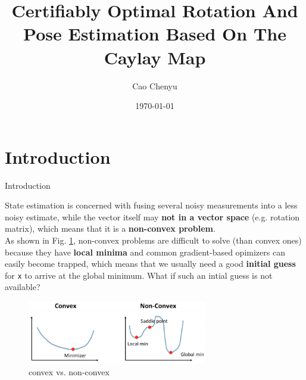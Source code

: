 \documentclass[8pt]{beamer}
\title[National University of Singapore]{\textbf{Certifiably Optimal Rotation And Pose Estimation Based On The Caylay Map}}
\author[cchenyu]{Cao Chenyu}
\institute[c.chenyu@u.nus.edu]{National University of Singapore}
\date[ME5419 Presentation]{\today}
\begin{document}
\frame{\titlepage}
\section{Introduction}
\begin{frame}{Introduction}

State estimation is concerned with fusing several noisy measurements into a less noisy estimate, while the vector itself may \textbf{not in a vector space} (e.g. rotation matrix), which means that it is a \textbf{non-convex problem}.\\
\vspace{1em}
As shown in Fig. \ref{fig:non-convex}, non-convex problems are difficult to solve (than convex ones) because they have \textbf{local minima} and common gradient-based opimizers can easily become trapped, which means that we usually need a good \textbf{initial guess} for \texttt{x} to arrive at the global minimum. What if such an intial guess is not available?
\begin{figure}
    \centering
    \includegraphics[width=0.7\textwidth]{figures/nonvex.jpg}
    \caption{convex vs. non-convex}
    \label{fig:non-convex}
\end{figure}


\end{frame}
\end{document}
